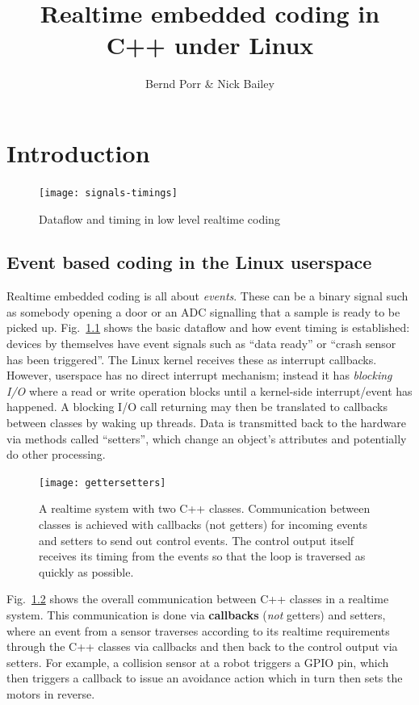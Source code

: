 \documentclass[12pt]{report}
\author{Bernd Porr \& Nick Bailey}
\title{Realtime embedded coding in C++ under Linux}
\begin{document}
\maketitle

\tableofcontents

\chapter{Introduction}



\begin{figure}[!hbt]
\begin{center}
\mbox{\texttt{[image: signals-timings]}}
\end{center}
\caption{Dataflow and timing in low level realtime coding
\label{timing}}
\end{figure}

\section{Event based coding in the Linux userspace}

Realtime embedded coding is all about \textsl{events}.
These can be a binary signal such as somebody opening a door or
an ADC signalling that a sample is ready to be picked up.
Fig.~\ref{timing} shows the basic dataflow and how event timing is
established: devices by themselves have event signals such as ``data
ready'' or ``crash sensor has been triggered''. The Linux kernel receives
these as interrupt callbacks. However, userspace has no direct interrupt
mechanism; instead it has \textsl{blocking I/O} where a read or write operation blocks
until a kernel-side interrupt/event has happened. A blocking I/O call returning
may then be translated to callbacks between classes by waking up threads.
Data is transmitted back to the hardware via methods called ``setters'',
which change an object's attributes and potentially do other processing.

\begin{figure}[!hbt]
\begin{center}
\mbox{\texttt{[image: gettersetters]}}
\end{center}
\caption{A realtime system with two C++ classes. Communication
  between classes is achieved with callbacks (not getters) for incoming events
  and setters to send out control events. The control output itself
  receives its timing from the events so that the loop is traversed
  as quickly as possible.
\label{gettersetters}}
\end{figure}
Fig.~\ref{gettersetters} shows the overall communication between C++
classes in a realtime system. This communication is done via \textbf{callbacks}
(\textsl{not} getters) and setters, where an event from a sensor
traverses according to its realtime requirements through the C++ classes via
callbacks and then back to the control output via setters. For example,
a collision sensor at a robot triggers a GPIO pin, which then triggers a
callback to issue an avoidance action which in turn then sets the
motors in reverse.
\end{document}
